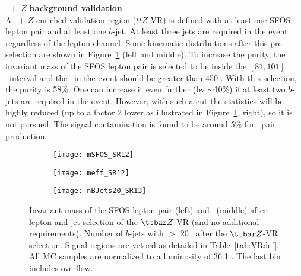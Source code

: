 \par{\bf \ttbar\ + $Z$ background validation\\}
A \ttbar\ + $Z$ enriched validation region ($ttZ$-VR) is defined with at least one SFOS lepton pair and at least one $b$-jet. At least three jets are required in the event regardless of the lepton channel. Some kinematic distributions after this pre-selection are shown in Figure~\ref{fig:ttZ_VR_afterLepJetSel} (left and middle). To increase the purity, the invariant mass of the SFOS lepton pair is selected to be inside the $[81, 101]$ \GeV~interval and the \meff\ in the event should be greater than 450 \GeV. With this selection, the purity is 58\%. One can increase it even further (by $\sim$10\%) if at least two $b$-jets are required in the event. However, with such a cut the statistics will be highly reduced (up to a factor 2 lower as illustrated in Figure~\ref{fig:ttZ_VR_afterLepJetSel}, right), so it is not pursued. The signal contamination is found to be around 5\% for \sbsb\ pair production.

\begin{figure}[t!]
\centering
\begin{subfigure}[t]{0.32\textwidth}
\texttt{[image: mSFOS\_SR12]}
\end{subfigure}
\begin{subfigure}[t]{0.32\textwidth}
\texttt{[image: meff\_SR12]}
\end{subfigure}
\begin{subfigure}[t]{0.32\textwidth}
\texttt{[image: nBJets20\_SR13]}
\end{subfigure}
\caption{Invariant mass of the SFOS lepton pair (left) and \meff\ (middle) after lepton and jet selection of the $\ttbar Z$-VR (and no additional requirements). Number of $b$-jets with \pt $>$ 20 \GeV~after the $\ttbar Z$-VR selection. Signal regions are vetoed as detailed in Table~\ref{tab:VRdef}. All MC samples are normalized to a luminosity of 36.1 \ifb. The last bin includes overflow.
}
\label{fig:ttZ_VR_afterLepJetSel}
\end{figure} 


